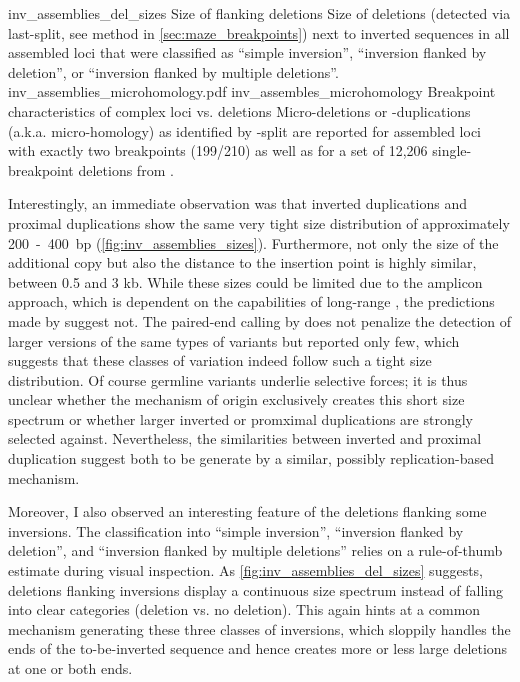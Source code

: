     {inv_assemblies_del_sizes}
    {Size of flanking deletions}
    {Size of deletions (detected via \acs{last}-split, see method in
    \cref{sec:maze_breakpoints}) next to inverted sequences in all assembled
    loci that were classified as ``simple inversion'', ``inversion flanked by
    deletion'', or ``inversion flanked by multiple deletions''.}
        {inv_assemblies_microhomology.pdf}
    {inv_assembles_microhomology}
    {Breakpoint characteristics of complex loci vs. deletions}
    {Micro-deletions or -duplications (a.k.a. micro-homology) as identified by
    \last-split are reported for assembled loci with exactly two breakpoints
    (199/210) as well as for a set of 12,206 single-breakpoint deletions from
    \cite{Sudmant2015}.}

Interestingly, an immediate observation was that inverted duplications and
proximal duplications show the same very tight size distribution of
approximately 200~-~400~bp (\cref{fig:inv_assemblies_sizes}). Furthermore, not
only the size of the
additional copy but also the distance to the insertion point is highly similar,
between 0.5 and 3 kb. While these sizes could be limited due to the amplicon
approach, which is dependent on the capabilities of long-range \pcr, the
predictions made by \delly suggest not. The paired-end calling by \delly does
not penalize the detection of larger versions of the same types of variants but
reported only few, which suggests that these classes of variation indeed follow
such a tight size distribution. Of course germline variants underlie selective
forces; it is thus unclear whether the mechanism of origin exclusively creates
this short size spectrum or whether larger inverted or promximal duplications
are strongly selected against. Nevertheless, the similarities between inverted
and proximal duplication suggest both to be generate by a similar, possibly
replication-based mechanism.

Moreover, I also observed an interesting feature of the deletions flanking some
inversions. The classification into ``simple inversion'', ``inversion flanked by
deletion'', and ``inversion flanked by multiple deletions'' relies on a
rule-of-thumb estimate during visual inspection. As
\cref{fig:inv_assemblies_del_sizes} suggests, deletions flanking inversions
display a continuous size spectrum instead of falling into clear categories
(deletion vs. no deletion). This again hints at a common mechanism generating
these three classes of inversions, which sloppily handles the ends of the
to-be-inverted sequence and hence creates more or less large deletions at one
or both ends.



